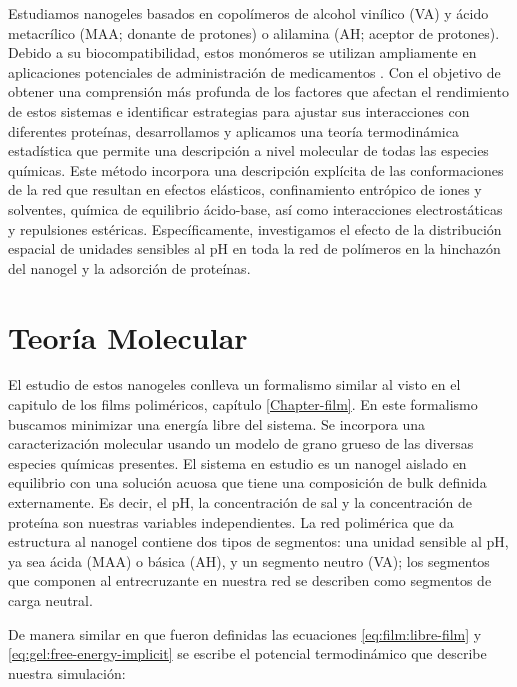 Estudiamos nanogeles basados en copol\'imeros de alcohol vin\'ilico (VA) y \'acido metacr\'ilico (MAA; donante de protones) o alilamina (AH; aceptor de protones).
Debido a su biocompatibilidad, estos mon\'omeros se utilizan ampliamente en aplicaciones potenciales de administraci\'on de medicamentos \cite{asadi2020common,sarwar2020smart,lowman1999oral}.
Con el objetivo de obtener una comprensi\'on m\'as profunda de los factores que afectan el rendimiento de estos sistemas e identificar estrategias para ajustar sus interacciones con diferentes prote\'inas, desarrollamos y aplicamos una teor\'ia termodin\'amica estad\'istica que permite una descripci\'on a nivel molecular de todas las especies qu\'imicas.
Este m\'etodo incorpora una descripci\'on expl\'icita de las conformaciones de la red que resultan en efectos el\'asticos, confinamiento entr\'opico de iones y solventes, qu\'imica de equilibrio \'acido-base, as\'i como interacciones electrost\'aticas y repulsiones est\'ericas.
Espec\'ificamente, investigamos el efecto de la distribuci\'on espacial de unidades sensibles al pH en toda la red de pol\'imeros en la hinchaz\'on del nanogel y la adsorci\'on de prote\'inas.



\section{Teor\'ia Molecular}
El estudio de estos nanogeles conlleva un formalismo similar al visto en el capitulo de los films polim\'ericos, cap\'itulo  \ref{Chapter-film}.
En este formalismo  buscamos minimizar una energ\'ia libre del sistema. Se incorpora una caracterizaci\'on molecular usando un modelo de grano grueso de las diversas especies qu\'imicas presentes.
El sistema en estudio es un nanogel aislado en equilibrio con una soluci\'on acuosa que tiene una composici\'on de bulk definida externamente.
Es decir, el pH, la concentraci\'on de sal y la concentraci\'on de prote\'ina son nuestras variables independientes.
La red polim\'erica que da estructura al nanogel contiene dos tipos de segmentos: una unidad sensible al pH, ya sea \'acida (MAA) o b\'asica (AH), y un segmento neutro (VA);
los segmentos que componen al entrecruzante en nuestra red se describen como segmentos de carga neutral.

De manera similar en que fueron definidas las ecuaciones \ref{eq:film:libre-film} y \ref{eq:gel:free-energy-implicit} se escribe el potencial termodin\'amico que describe nuestra simulaci\'on:

